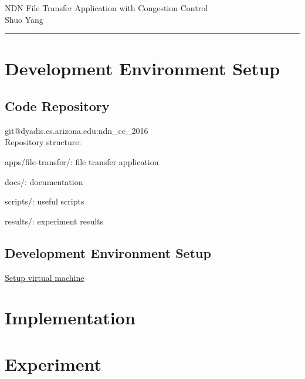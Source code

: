 \documentclass[10pt]{article}
\begin{document}
\noindent


\begin{center}
  NDN File Transfer Application with Congestion Control\\
  Shuo Yang\\
  \vspace{1em}
\end{center}

\hrule\smallskip
\vspace{1em}
\section{Development Environment Setup}

\subsection{Code Repository}
git@dyadis.cs.arizona.edu:ndn\_cc\_2016\\

Repository structure:

apps/file-transfer/: file transfer application

docs/: documentation

scripts/: useful scripts

results/: experiment results

\subsection{Development Environment Setup}

\underline{Setup virtual machine}


\section{Implementation}

\section{Experiment}
\end{document}
